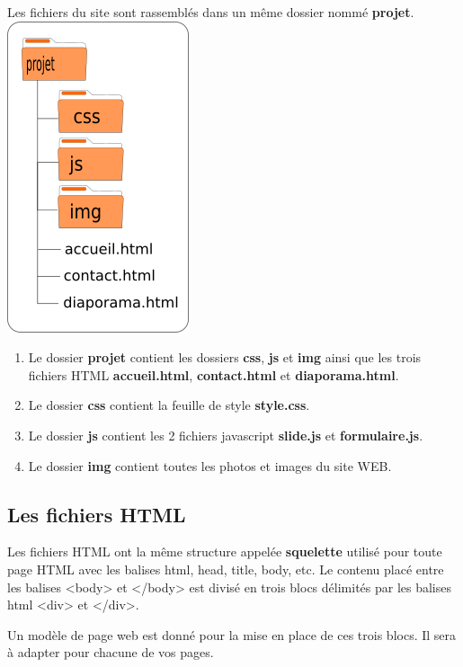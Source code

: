 Les fichiers du site sont rassemblés dans un même dossier nommé
\textbf{projet}. \includegraphics{img/arbo_projet.png}

\begin{enumerate}
\tightlist
\item
  Le dossier \textbf{projet} contient les dossiers \textbf{css},
  \textbf{js} et \textbf{img} ainsi que les trois fichiers HTML
  \textbf{accueil.html}, \textbf{contact.html} et
  \textbf{diaporama.html}.
\item
  Le dossier \textbf{css} contient la feuille de style
  \textbf{style.css}.
\item
  Le dossier \textbf{js} contient les 2 fichiers javascript
  \textbf{slide.js} et \textbf{formulaire.js}.
\item
  Le dossier \textbf{img} contient toutes les photos et images du site
  WEB.
\end{enumerate}

\hypertarget{les-fichiers-html}{%
\subsection{Les fichiers HTML}\label{les-fichiers-html}}

Les fichiers HTML ont la même structure appelée \textbf{squelette}
utilisé pour toute page HTML avec les balises html, head, title, body,
etc. Le contenu placé entre les balises \textless body\textgreater{} et
\textless/body\textgreater{} est divisé en trois blocs délimités par les
balises html \textless div\textgreater{} et \textless/div\textgreater.

Un modèle de page web est donné pour la mise en place de ces trois
blocs. Il sera à adapter pour chacune de vos pages.

